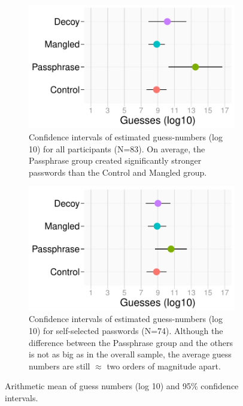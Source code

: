 \begin{figure}
	\centering
	\begin{subfigure}[c]{0.45\textwidth}
		\includegraphics[width=\textwidth]{figures/decoy/ci-guessesLog10-all}
		\caption{\label{fig:decoy:ci-guesses-all} Confidence intervals of estimated guess-numbers (log 10) for all participants (N=83). On average, the Passphrase group created significantly stronger passwords than the Control and Mangled group.}
	\end{subfigure}
	\hspace*{0.3cm}
	\begin{subfigure}[c]{0.45\textwidth}
		\includegraphics[width=\textwidth]{figures/decoy/ci-guessesLog10-own}
		\caption{\label{fig:decoy:ci-guesses-own}
			Confidence intervals of estimated guess-numbers (log 10) for self-selected passwords (N=74). Although the difference between the Passphrase group and the others is not as big as in the overall sample, the average guess numbers are still $\approx$ two orders of magnitude apart.}
	\end{subfigure}
	\caption{\label{fig:decoy:results-strenth} Arithmetic mean of guess numbers (log 10) and 95\% confidence intervals.} 
\end{figure}

